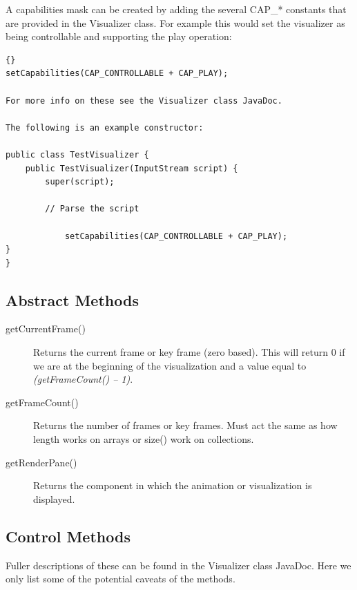 \documentclass[11pt,letterpaper]{book}
\begin{document}
A capabilities mask can be created by adding the several CAP\_*
constants that are provided in the Visualizer class. For example this
would set the visualizer as being controllable and supporting the play
operation:

\begin{lstlisting}{}
setCapabilities(CAP_CONTROLLABLE + CAP_PLAY);

For more info on these see the Visualizer class JavaDoc.

The following is an example constructor:

public class TestVisualizer {
	public TestVisualizer(InputStream script) {
		super(script);

		// Parse the script
		
			setCapabilities(CAP_CONTROLLABLE + CAP_PLAY);
}
}
\end{lstlisting}

\subsection{Abstract Methods}


\begin{description}
\item[getCurrentFrame()] 

  Returns the current frame or key frame (zero based). This will
  return 0 if we are at the beginning of the visualization and a value
  equal to \newline\textit{ (getFrameCount() – 1)}.


\item[getFrameCount()] Returns the number of frames or key
  frames. Must act the same as how length works on arrays or size()
  work on collections.


\item[getRenderPane()] Returns the component in which the animation or
  visualization is displayed.
\end{description}

\subsection{Control Methods}
Fuller descriptions of these can be found in the Visualizer class
JavaDoc. Here we only list some of the potential caveats of the
methods.
\end{document}
